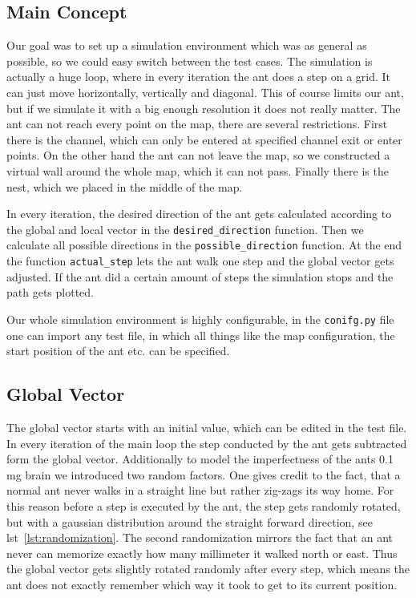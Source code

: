 \documentclass[11pt]{article}
\begin{document}
	\subsection{Main Concept}
		Our goal was to set up a simulation environment which was as general as possible, so we could easy switch between the test cases. The simulation is actually a huge loop, where in every iteration the ant does a step on a grid. It can just move horizontally, vertically and diagonal. This of course limits our ant, but if we simulate it with a big enough resolution it does not really matter. The ant can not reach every point on the map, there are several restrictions. First there is the channel, which can only be entered at specified channel exit or enter points. On the other hand the ant can not leave the map, so we constructed a virtual wall around the whole map, which it can not pass. Finally there is the nest, which we placed in the middle of the map.

In every iteration, the desired direction of the ant gets calculated according to the global and local vector in the \texttt{desired\_direction} function. Then we calculate all possible directions in the \texttt{possible\_direction} function. At the end the function \texttt{actual\_step} lets the ant walk one step and the global vector gets adjusted. If the ant did a certain amount of steps the simulation stops and the path gets plotted.

Our whole simulation environment is highly configurable, in the \texttt{conifg.py} file one can import any test file, in which all things like the map configuration, the start position of the ant etc. can be specified.
	\subsection{Global Vector}
		The global vector starts with an initial value, which can be edited in the test file. In every iteration of the main loop the step conducted by the ant gets subtracted form the global vector. Additionally to model the imperfectness of the ants 0.1 mg brain we introduced two random factors. One gives credit to the fact, that a normal ant never walks in a straight line but rather zig-zags its way home. For this reason before a step is executed by the ant, the step gets randomly rotated, but with a gaussian distribution around the straight forward direction, see lst~\vref{lst:randomization}. The second randomization mirrors the fact that an ant never can memorize exactly how many millimeter it walked north or east. Thus the global vector gets slightly rotated randomly after every step, which means the ant does not exactly remember which way it took to get to its current position.
		
\end{document}
